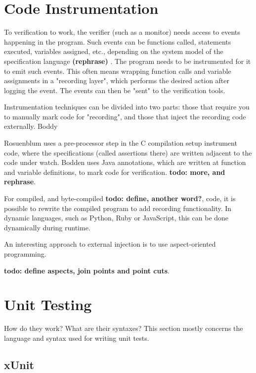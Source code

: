 \documentclass[a4paper,11pt]{kth-mag}
\newcommand{\todo}[1]{\textbf{todo: #1}}
\newcommand{\rephrase}{\textbf{(rephrase)} }
\begin{document}
\section{Code Instrumentation} \label{section-instrumentation}

To verification to work, the verifier (such as a monitor) needs access to events happening in the
program. Such events can be functions called, statements executed, variables assigned, etc., depending on the system model of the specification language \rephrase. The program needs to be instrumented for it to emit such events. This often means wrapping function calls and variable assignments in a "recording layer", which performs the desired action after logging the event.
The events can then be "sent" to the verification tools.

Instrumentation techniques can be divided into two parts: those that require you to manually
mark code for "recording", and those that inject the recording code externally. Boddy

Rosuenblum \cite{rosenblum95practicalassertions} uses a pre-processor step
in the C compilation setup instrument code, where the specifications (called assertions there)
are written adjacent to the code under watch. Bodden \cite{bodden05efficientrv} uses Java annotations, which are written at function and variable definitions, to mark code for verification. \todo{more, and rephrase}.

For compiled, and byte-compiled \todo{define, another word?}, code, it is possible to rewrite the 
compiled program to add recording functionality. In dynamic languages, such as Python, Ruby or JavaScript, this can be done dynamically during runtime.

An interesting approach to external injection is to use aspect-oriented programming.

\todo{define aspects, join points and point cuts}.


\section{Unit Testing} \label{section-unit-testing}

How do they work? What are their syntaxes? This section mostly concerns the language and syntax used for writing unit tests.

\subsection{xUnit}
\end{document}
